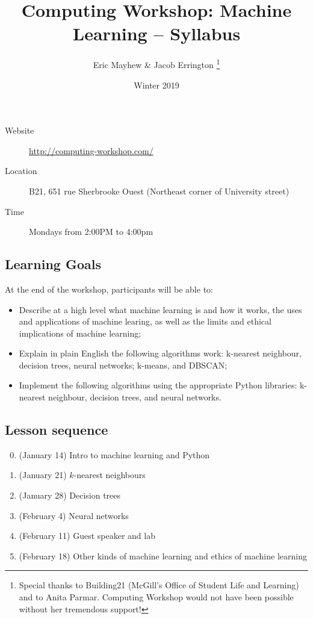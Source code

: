 \documentclass[11pt]{article}
\author{%
  Eric Mayhew \& Jacob Errington%
  \footnote{%
    Special thanks to Building21 (McGill's Office of Student Life and Learning)
    and to Anita Parmar.
    Computing Workshop would not have been possible without her tremendous
    support!
  }
}
\title{\vspace{-2em}Computing Workshop: Machine Learning -- Syllabus}
\date{Winter 2019}
\begin{document}
\maketitle

\begin{multicols}{2}
\begin{description}
  \item[Website]
    \url{http://computing-workshop.com/}

  \item[Location]
    B21, 651 rue Sherbrooke Ouest
    (Northeast corner of University street)

  \item[Time]
    Mondays from 2:00PM to 4:00pm
\end{description}

\subsection*{Learning Goals}

At the end of the workshop, participants will be able to:

\begin{itemize}
\item Describe at a high level what machine learning is and how it works, the uses and applications of machine learing,
  as well as the limits and ethical implications of machine learning;
\item Explain in plain English the following algorithms work: k-nearest neighbour, decision trees, neural networks;
  k-means, and DBSCAN;
\item Implement the following algorithms using the appropriate Python libraries: k-nearest neighbour, decision trees, and neural networks.
\end{itemize}

\subsection*{Lesson sequence}

\begin{enumerate}
    \setcounter{enumi}{-1}
  \item (January 14) Intro to machine learning and Python
  \item (January 21) $k$-nearest neighbours
  \item (January 28) Decision trees
  \item (February 4) Neural networks
  \item (February 11) Guest speaker and lab
  \item (February 18) Other kinds of machine learning and ethics of machine learning
\end{enumerate}


\end{multicols}
\end{document}
